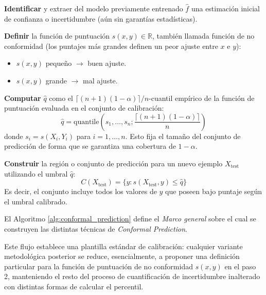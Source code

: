\begin{algorithm}[H]
\caption{Proceso de Calibración en \textit{Marco general - Predicción Conforme}}
\label{alg:conformal_prediction}
\begin{algorithmic}[1] %
    \STATE \textbf{Identificar}  y extraer del modelo previamente entrenado $\hat{f}$ una estimación inicial de confianza o incertidumbre (aún sin garantías estadísticas).
    
    \STATE \textbf{Definir} la función de puntuación $s(x,y) \in \mathbb{R}$, también llamada función de no conformidad (los puntajes más grandes definen un peor ajuste entre $x$ e $y$):
    \begin{itemize}
        \item $s(x,y)$ pequeño $\rightarrow$ buen ajuste.
        \item $s(x,y)$ grande $\rightarrow$ mal ajuste.
    \end{itemize}

    \STATE \textbf{Computar} $\hat{q}$ como el $\lceil(n+1)(1-\alpha)\rceil/n$-cuantil empírico de la función de puntuación evaluada en el conjunto de calibración:
    \begin{equation*}
        \hat{q} = \text{quantile}\left(s_1, \dots, s_n; \frac{\lceil(n+1)(1-\alpha)\rceil}{n}\right)
    \end{equation*}
    donde $s_i = s(X_i, Y_i)$ para $i=1, \dots, n$. Esto fija el tamaño del conjunto de predicción de forma que se garantiza una cobertura de $1-\alpha$.

    \STATE \textbf{Construir} la región o conjunto de predicción para un nuevo ejemplo $X_{\text{test}}$ utilizando el umbral $\hat{q}$:
    \begin{equation*}
        C(X_{\text{test}}) = \{ y : s(X_{\text{test}}, y) \le \hat{q} \}
    \end{equation*}
    Es decir, el conjunto incluye todos los valores de $y$ que poseen bajo puntaje según el umbral calibrado.
\end{algorithmic}
\end{algorithm}

El Algoritmo \ref{alg:conformal_prediction} define el \textit{Marco general} sobre el cual se construyen las distintas técnicas de \textit{Conformal Prediction}.

Este flujo establece una plantilla estándar de calibración: cualquier variante metodológica posterior se reduce, esencialmente, a proponer una definición particular para la función de puntuación de no conformidad $s(x,y)$ en el paso 2, manteniendo el resto del proceso de cuantificación de incertidumbre inalterado con distintas formas de calcular el percentil.


